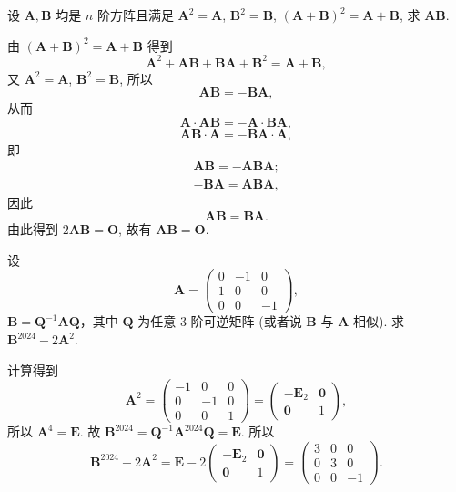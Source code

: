 \documentclass[../../main.tex]{subfiles}%
\begin{document}
\begin{example}
设 $\boldsymbol{A},\boldsymbol{B}$ 均是 $n$ 阶方阵且满足 $\boldsymbol{A}^2 = \boldsymbol{A}$, $\boldsymbol{B}^2 = \boldsymbol{B}$, $(\boldsymbol{A} + \boldsymbol{B})^2 = \boldsymbol{A} + \boldsymbol{B}$, 求 $\boldsymbol{AB}$.
\end{example}
\begin{solution}
由 $(\boldsymbol{A} + \boldsymbol{B})^2 = \boldsymbol{A} + \boldsymbol{B}$ 得到
\[
\boldsymbol{A}^2 + \boldsymbol{AB} + \boldsymbol{BA} + \boldsymbol{B}^2 = \boldsymbol{A} + \boldsymbol{B},
\]
又 $\boldsymbol{A}^2 = \boldsymbol{A}$, $\boldsymbol{B}^2 = \boldsymbol{B}$, 所以
\[
\boldsymbol{AB} = -\boldsymbol{BA},
\]
从而
\[
\boldsymbol{A} \cdot \boldsymbol{AB} = -\boldsymbol{A} \cdot \boldsymbol{BA},
\]
\[
\boldsymbol{AB} \cdot \boldsymbol{A} = -\boldsymbol{BA} \cdot \boldsymbol{A},
\]
即
\begin{gather*}
\boldsymbol{AB}=-\boldsymbol{ABA};
\\
-\boldsymbol{BA}=\boldsymbol{ABA},
\end{gather*}
因此
\[
\boldsymbol{AB} = \boldsymbol{BA}.
\]
由此得到 $2\boldsymbol{AB} = \boldsymbol{O}$, 故有 $\boldsymbol{AB} = \boldsymbol{O}$.

\end{solution}

\begin{example}
设
\[
\boldsymbol{A} = \begin{pmatrix} 0 & -1 & 0 \\ 1 & 0 & 0 \\ 0 & 0 & -1 \end{pmatrix},
\]
\(\boldsymbol{B} = \boldsymbol{Q}^{-1}\boldsymbol{A}\boldsymbol{Q}\)，其中 \(\boldsymbol{Q}\) 为任意 3 阶可逆矩阵 (或者说 \(\boldsymbol{B}\) 与 \(\boldsymbol{A}\) 相似). 求 \(\boldsymbol{B}^{2024} - 2\boldsymbol{A}^2\).
\end{example}
\begin{solution}
计算得到
\[
\boldsymbol{A}^2 = \begin{pmatrix} -1 & 0 & 0 \\ 0 & -1 & 0 \\ 0 & 0 & 1 \end{pmatrix} = \begin{pmatrix} -\boldsymbol{E}_2 & \boldsymbol{0} \\ \boldsymbol{0} & 1 \end{pmatrix},
\]
所以 \(\boldsymbol{A}^4 = \boldsymbol{E}\). 故 \(\boldsymbol{B}^{2024} = \boldsymbol{Q}^{-1}\boldsymbol{A}^{2024}\boldsymbol{Q} = \boldsymbol{E}\). 所以
\[
\boldsymbol{B}^{2024} - 2\boldsymbol{A}^2 = \boldsymbol{E} - 2\begin{pmatrix} -\boldsymbol{E}_2 & \boldsymbol{0} \\ \boldsymbol{0} & 1 \end{pmatrix} = \begin{pmatrix} 3 & 0 & 0 \\ 0 & 3 & 0 \\ 0 & 0 & -1 \end{pmatrix}.
\]

\end{solution}
\end{document}
